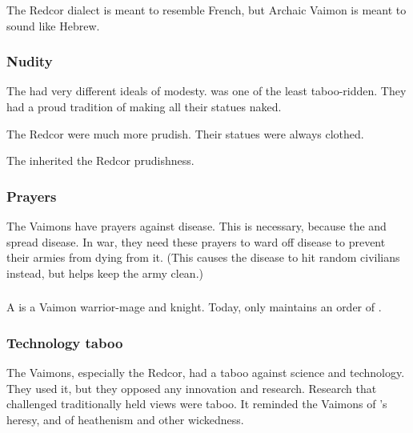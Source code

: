The Redcor dialect is meant to resemble French, but Archaic Vaimon is meant to sound like Hebrew. 





\subsubsection{Nudity}
The \vclans had very different ideals of modesty. 
\ClanZether was one of the least taboo-ridden. 
They had a proud tradition of making all their statues naked. 

The Redcor were much more prudish.
Their statues were always clothed.

The \Telcras inherited the Redcor prudishness.





\subsubsection{Prayers}
The Vaimons have prayers against disease. 
This is necessary, because the  and spread disease. 
In war, they need these prayers to ward off disease to prevent their armies from dying from it. 
(This causes the disease to hit random civilians instead, but helps keep the army clean.) 





\subsubsection{\Templars}
\index{\templar}
A \templar{} is a Vaimon warrior-mage and knight. 
Today, only \ClanRedcor maintains an order of \templars{}. 





\subsubsection{Technology taboo}
The Vaimons, especially the Redcor, had a taboo against science and technology.
They used it, but they opposed any innovation and research.
Research that challenged traditionally held views were taboo.
It reminded the Vaimons of \Belzir's heresy, and of heathenism and other wickedness.










